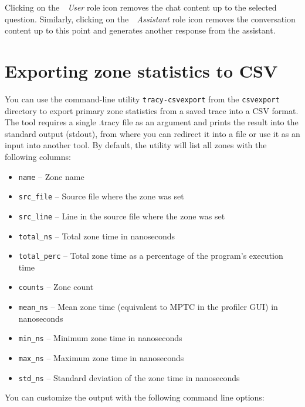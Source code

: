 \documentclass[hidelinks,titlepage,a4paper,twoside]{article}
\begin{document}
Clicking on the~\emph{\faUser{}~User} role icon removes the chat content up to the selected question. Similarly, clicking on the~\emph{\faRobot{}~Assistant} role icon removes the conversation content up to this point and generates another response from the assistant.

\section{Exporting zone statistics to CSV}
\label{csvexport}

You can use the command-line utility \texttt{tracy-csvexport} from the \texttt{csvexport} directory to export primary zone statistics from a saved trace into a CSV format.
The tool requires a single .tracy file as an argument and prints the result into the standard output (stdout), from where you can redirect it into a file or use it as an input into another tool.
By default, the utility will list all zones with the following columns:

\begin{itemize}
  \item \texttt{name} -- Zone name
  \item \texttt{src\_file} -- Source file where the zone was set
  \item \texttt{src\_line} -- Line in the source file where the zone was set
  \item \texttt{total\_ns} -- Total zone time in nanoseconds
  \item \texttt{total\_perc} -- Total zone time as a percentage of the program's execution time
  \item \texttt{counts} -- Zone count
  \item \texttt{mean\_ns} -- Mean zone time (equivalent to MPTC in the profiler GUI) in nanoseconds
  \item \texttt{min\_ns} -- Minimum zone time in nanoseconds
  \item \texttt{max\_ns} -- Maximum zone time in nanoseconds
  \item \texttt{std\_ns} -- Standard deviation of the zone time in nanoseconds
\end{itemize}

You can customize the output with the following command line options:
\end{document}
